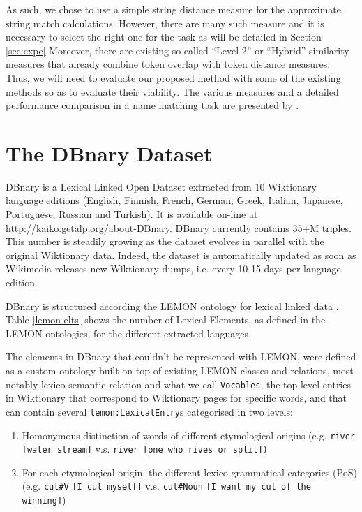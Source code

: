 \documentclass[10pt, a4paper]{article}
\begin{document}
As such, we chose to use a simple string distance measure for the approximate string match calculations. However, there are many such measure and it is necessary to select the right one for the task as will be detailed in Section \ref{sec:expe} Moreover, there are existing so called ``Level 2'' or ``Hybrid'' similarity measures that already combine token overlap with token distance measures. Thus, we will need to evaluate our proposed method with some of the existing methods so as to evaluate their viability. The various measures and a detailed performance comparison in a name matching task are presented by \cite{Cohen2003}.

\section{The DBnary Dataset}

DBnary is a Lexical Linked Open Dataset extracted from 10 Wiktionary language editions (English, Finnish, French, German, Greek, Italian, Japanese, Portuguese, Russian and Turkish). It is available on-line at \url{http://kaiko.getalp.org/about-DBnary}. DBnary currently contains 35+M triples. This number is steadily growing as the dataset evolves in parallel with the original Wiktionary data. Indeed, the dataset is automatically updated as soon as Wikimedia releases new Wiktionary dumps, i.e. every 10-15 days per language edition. 

DBnary is structured according the LEMON ontology for lexical linked data \cite{McCrae2012}. Table \ref{lemon-elts} shows the number of Lexical Elements, as defined in the LEMON ontologies, for the different extracted languages. 

The elements in DBnary that couldn't be represented with LEMON, were defined as a custom ontology built on top of existing LEMON classes and relations, most notably lexico-semantic relation and what we call \verb|Vocables|, the top level entries in Wiktionary that correspond to Wiktionary pages for specific words, and that can contain several \verb|lemon:LexicalEntry|s categorised in two levels:
\begin{enumerate}
	\item Homonymous distinction of words of different etymological origins (e.g. \verb|river [water stream]| v.s. \verb|river [one who rives or split])|
	\item For each etymological origin, the different lexico-grammatical categories (PoS) (e.g. \verb|cut#V| \verb|[I cut myself]| v.s. \verb|cut#Noun| \verb|[I want my cut of the winning]|)
\end{enumerate}
\end{document}
